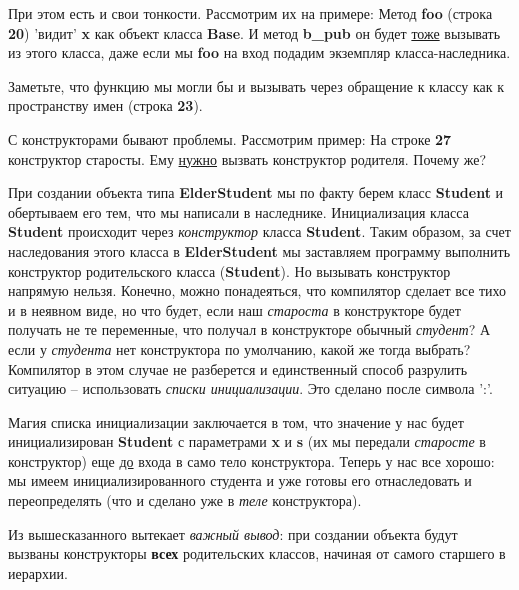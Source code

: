 \begin{lecture}[\lectureSubject]
\begin{lecSection}
		При этом есть и свои тонкости. Рассмотрим их на примере:
		Метод \textbf{foo} (строка \textbf{20}) 'видит' \textbf{x} как объект класса \textbf{Base}. И метод \textbf{b\_pub} он будет \underline{тоже} вызывать из этого класса, даже если мы \textbf{foo} на вход подадим экземпляр класса-наследника.
		
		Заметьте, что функцию мы могли бы и вызывать через обращение к классу как к пространству имен (строка \textbf{23}).
	\end{lecSection}
	\begin{lecSection}
			С конструкторами бывают проблемы. Рассмотрим пример:
			На строке \textbf{27} конструктор старосты. Ему \underline{нужно} вызвать конструктор родителя. Почему же?
			
			При создании объекта типа \textbf{ElderStudent} мы по факту берем класс \textbf{Student} и обертываем его тем, что мы написали в наследнике. Инициализация класса \textbf{Student} происходит через \textit{конструктор} класса \textbf{Student}. Таким образом, за счет наследования этого класса в \textbf{ElderStudent} мы заставляем программу выполнить конструктор родительского класса (\textbf{Student}). Но вызывать конструктор напрямую нельзя. Конечно, можно понадеяться, что компилятор сделает все тихо и в неявном виде, но что будет, если наш \textit{староста} в конструкторе будет получать не те переменные, что получал в конструкторе обычный \textit{студент}? А если у \textit{студента} нет конструктора по умолчанию, какой же тогда выбрать? Компилятор в этом случае не разберется и единственный способ разрулить ситуацию -- использовать \textit{списки 
				инициализации}. Это сделано после символа ':'.
			
			Магия списка инициализации заключается в том, что значение у нас будет инициализирован \textbf{Student} с параметрами \textbf{x} и \textbf{s} (их мы передали \textit{старосте} в конструктор) еще \underline{до} входа в само тело конструктора. Теперь у нас все хорошо: мы имеем инициализированного студента и уже готовы его отнаследовать и переопределять (что и сделано уже в \textit{теле} конструктора).
			
			Из вышесказанного вытекает \textit{важный вывод}: при создании объекта будут вызваны конструкторы \textbf{всех} родительских классов, начиная от самого старшего в иерархии.
			

\end{lecSection}
\end{lecture}
